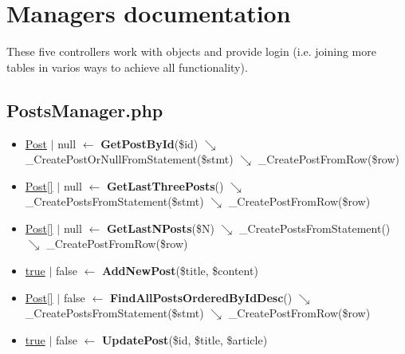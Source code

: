 \section{Managers documentation}
\par These five controllers work with objects and provide login (i.e. joining more tables in varios ways to achieve all functionality).
\subsection{PostsManager.php}
\begin{itemize}
  \setlength\itemsep{0em}
  \item \underline{Post} $\vert$ null $\leftarrow$ \textbf{GetPostById}(\$id)
  \newline    $\searrow$ \_CreatePostOrNullFromStatement(\$stmt)
  \newline    $\searrow$ \_CreatePostFromRow(\$row)
  \item \underline{Post[]} $\vert$ null $\leftarrow$ \textbf{GetLastThreePosts}()
  \newline    $\searrow$ \_CreatePostsFromStatement(\$stmt)
  \newline    $\searrow$ \_CreatePostFromRow(\$row)
  \item \underline{Post[]} $\vert$ null $\leftarrow$ \textbf{GetLastNPosts}(\$N)
  \newline    $\searrow$ \_CreatePostsFromStatement()
  \newline    $\searrow$ \_CreatePostFromRow(\$row)
  \item \underline{true} $\vert$ false $\leftarrow$ \textbf{AddNewPost}(\$title, \$content)
  \item \underline{Post[]} $\vert$ false $\leftarrow$ \textbf{FindAllPostsOrderedByIdDesc}()
  \newline    $\searrow$ \_CreatePostsFromStatement(\$stmt)
  \newline    $\searrow$ \_CreatePostFromRow(\$row)
  \item \underline{true} $\vert$ false $\leftarrow$ \textbf{UpdatePost}(\$id, \$title, \$article)
\end{itemize}
